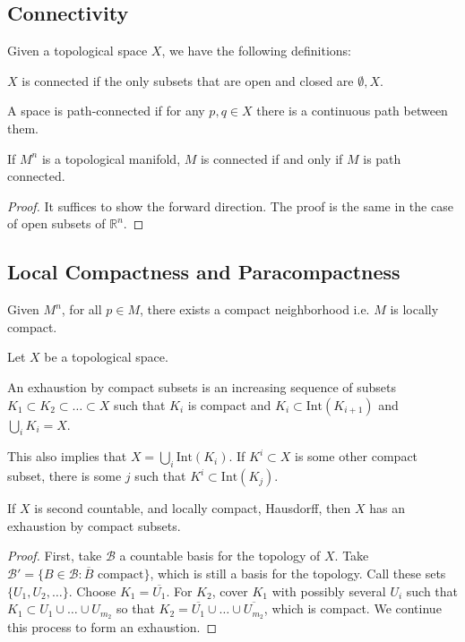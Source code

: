 \documentclass[12pt]{scrartcl}
\newcommand{\R}{\mathbb{R}}
\let \mc \mathcal
\let \ol \overline
\begin{document}
\subsection{Connectivity}
Given a topological space $X$, we have the following definitions:
\begin{definition} $X$ is connected if the only subsets that are open and closed are $\emptyset, X$.
\end{definition}
\begin{definition} A space is path-connected if for any $p, q \in X$ there is a continuous path between them.  
\end{definition}
\begin{thm} If $M^n$ is a topological manifold, $M$ is connected if and only if $M$ is path connected.  
 \end{thm}
 \begin{proof}
 It suffices to show the forward direction.  The proof is the same in the case of open subsets of $\R^n$.  
 \end{proof}
 
\subsection{Local Compactness and Paracompactness}

\begin{proposition} Given $M^n$, for all $p \in M$, there exists a compact neighborhood i.e. $M$ is locally compact.
\end{proposition}
Let $X$ be a topological space.
\begin{definition} An exhaustion by compact subsets is an increasing sequence of subsets $K_1 \subset K_2 \subset \dots \subset X$ such that $K_i$ is compact and $K_i \subset \text{Int}(K_{i+1})$ and $\bigcup_i K_i = X$.
\end{definition}

\begin{remark} This also implies that $X = \bigcup_i \text{Int}(K_i)$.  If $K^i \subset X$ is some other compact subset,  there is some $j$ such that $K^i \subset \text{Int}(K_j)$.
\end{remark}
\begin{proposition} If $X$ is second countable, and locally compact, Hausdorff, then $X$ has an exhaustion by compact subsets.  
\end{proposition}
\begin{proof} First, take $\mc B$ a countable basis for the topology of $X$.  Take $\mc B' = \{B \in \mc B : \ol{B} \text{ compact}\}$, which is still a basis for the topology.  Call these sets $\{U_1, U_2, \dots \}$.  Choose $K_1 = \ol{U_1}$.  For $K_2$, cover $K_1$ with possibly several $U_i$ such that $K_1 \subset U_1 \cup \dots \cup U_{m_2}$ so that $K_2 = \overline{U_1} \cup \dots \cup \ol{U_{m_2}}$, which is compact.  We continue this process to form an exhaustion. 
\end{proof}
\end{document}
